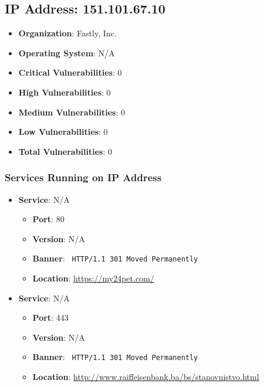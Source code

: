 \documentclass{article}
\begin{document}
\clearpage



\subsection*{IP Address: 151.101.67.10}

\begin{itemize}
    \item \textbf{Organization}: Fastly, Inc.
    \item \textbf{Operating System}:  N/A 
    \item \textbf{Critical Vulnerabilities}: 0
    \item \textbf{High Vulnerabilities}: 0
    \item \textbf{Medium Vulnerabilities}: 0
    \item \textbf{Low Vulnerabilities}: 0
    \item \textbf{Total Vulnerabilities}: 0
\end{itemize}

\subsubsection*{Services Running on IP Address}

\begin{itemize}
    
        \item \textbf{Service}: N/A
        \begin{itemize}
            \item \textbf{Port}: 80
            \item \textbf{Version}:  N/A 
            \item \textbf{Banner}: \texttt{ HTTP/1.1 301 Moved Permanently
 }
            \item \textbf{Location}: \href{ https://my24pet.com/ }{ https://my24pet.com/ }
        \end{itemize}
    
        \item \textbf{Service}: N/A
        \begin{itemize}
            \item \textbf{Port}: 443
            \item \textbf{Version}:  N/A 
            \item \textbf{Banner}: \texttt{ HTTP/1.1 301 Moved Permanently
 }
            \item \textbf{Location}: \href{ http://www.raiffeisenbank.ba/bs/stanovnistvo.html }{ http://www.raiffeisenbank.ba/bs/stanovnistvo.html }
        \end{itemize}
    
\end{itemize}
\end{document}
